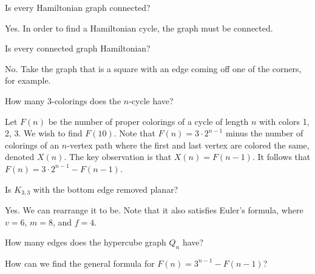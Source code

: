 
\begin{eg}
	Is every Hamiltonian graph connected?
\end{eg}

Yes. In order to find a Hamiltonian cycle, the graph must be connected.

\begin{eg}
	Is every connected graph Hamiltonian?
\end{eg}

No. Take the graph that is a square with an edge coming off one of the corners, for example.

\begin{eg}
	How many 3-colorings does the \( n \)-cycle have?
\end{eg}

Let \( F(n) \) be the number of proper colorings of a cycle of length \( n \) with colors 1, 2, 3. We wish to find \( F(10) \). Note that \( F(n) = 3\cdot 2^{n-1}\) minus the number of colorings of an \( n \)-vertex path where the first and last vertex are colored the same, denoted \( X(n) \). The key observation is that \( X(n) = F(n-1) \). It follows that \( F(n) = 3\cdot 2^{n-1}-F(n-1)  \).

\begin{eg}
	Is \( K_{3,3} \) with the bottom edge removed planar?
\end{eg}

Yes. We can rearrange it to be. Note that it also satisfies Euler's formula, where \( v = 6 \), \( m = 8 \), and \( f = 4 \).

How many edges does the hypercube graph \( Q_n \) have?

How can we find the general formula for \( F(n) = 3^{n-1} - F(n-1) \)?
